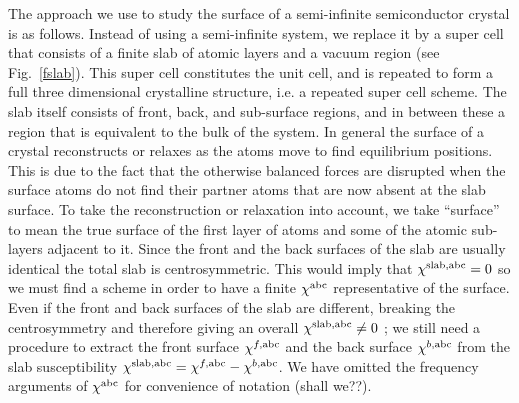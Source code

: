 \documentclass[floatfix,prb,aps,superscriptaddress,11pt,preprint,letterpaper]{revtex4}
\def\chon{red}
\begin{document}

The approach we use to study the surface of a semi-infinite
semiconductor crystal is as follows. Instead of using a
semi-infinite system, we replace it by a super cell that 
{\color{\chon} consists} of a finite
slab of atomic layers and a vacuum region (see Fig.~\ref{fslab}). This
super cell {\color{\chon} constitutes the unit cell, and}
is repeated to form a full three dimensional crystalline structure,
i.e. a repeated super cell scheme. 
The slab itself consists of {\color{\chon} front, back, and 
sub-surface} regions, and in between these
a region that is equivalent to {\color{\chon} the}
bulk of the system. 
In general the surface of a crystal reconstructs or relaxes as the atoms
move to find equilibrium positions. This is due to the fact that
the otherwise
balanced forces are disrupted when the surface atoms do not find their 
partner atoms that are now absent at the {\color{\chon} slab surface.} 
To take the reconstruction or relaxation into account, 
we take ``surface'' to mean
the true surface of the first layer of {\color{\chon} atoms} and
some of the atomic sub-layers adjacent to it.
Since the front and the back
surfaces of the slab are usually identical the total slab is
centrosymmetric. This would imply that 
$\chi^{\mathrm{slab},\mathrm{a}\mathrm{b}\mathrm{c}}=0$ {\color{\chon} so} we must
find a scheme 
in order to have a finite $\chi^{\mathrm{a}\mathrm{b}\mathrm{c}}$ representative of the
surface. Even if the front and back surfaces of the slab 
are different, breaking the centrosymmetry and therefore giving an
overall $\chi^{\mathrm{slab},\mathrm{a}\mathrm{b}\mathrm{c}}\ne 0${\color{\chon} ;} we still
need a procedure to extract the front surface $\chi^{f,\mathrm{a}\mathrm{b}\mathrm{c}}$
and the back surface $\chi^{b,\mathrm{a}\mathrm{b}\mathrm{c}}$ from the slab
susceptibility 
$\chi^{\mathrm{slab},\mathrm{a}\mathrm{b}\mathrm{c}}=\chi^{f,\mathrm{a}\mathrm{b}\mathrm{c}}-\chi^{b,\mathrm{a}\mathrm{b}\mathrm{c}}$.
We have omitted the frequency arguments of $\chi^{\mathrm{a}\mathrm{b}\mathrm{c}}$ for 
{\color{\chon} convenience of} notation ({\color{blue}shall we??}). 
\end{document}
